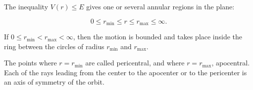 The inequality $V(r) \leq E$ gives one or several annular regions in the plane:

$$0 \leq r_{\min} \leq r \leq r_{\max} \leq \infty.$$

If $0 \leq r_{\min} < r_{\max} < \infty$, then the motion is bounded and takes place inside the ring between the circles of radius $r_{\min}$ and $r_{\max}$.

The points where $r = r_{\min}$ are called pericentral, and where $r = r_{\max}$, apocentral. Each of the rays leading from the center to the apocenter or to the pericenter is an axis of symmetry of the orbit.
